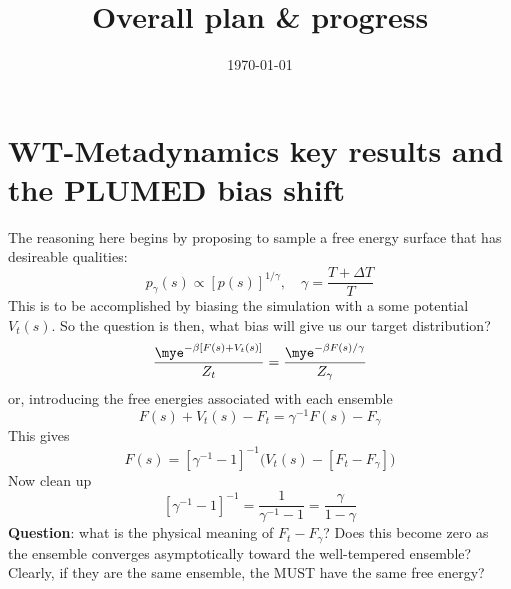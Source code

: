 \documentclass[twocolumn]{notes}
\begin{document}
\title{Overall plan \& progress}
\date{\today} %
\maketitle
\tableofcontents
\newpage







\section{WT-Metadynamics key results and the PLUMED bias shift}

The reasoning here begins by proposing to sample a free energy surface that has desireable qualities:
\[
    p_\gamma(s) \propto [p(s)]^{1/\gamma} ,\quad \gamma = \frac{T+\Delta T}{T}
\]
This is to be accomplished by biasing the simulation with a some potential $V_t(s)$.  So the question is then, what bias will give us our target distribution?
\[
    \frac{\mye^{-\beta[F(s)+V_t(s)]}}{Z_t} = \frac{\mye^{-\beta F(s)/\gamma}}{Z_\gamma}
\]
or, introducing the free energies associated with each ensemble
\[
    F(s)+V_t(s)-F_t = \gamma^{-1}F(s) - F_\gamma
\]
This gives
\[
    F(s) = [\gamma^{-1}-1]^{-1}\Big(V_t(s) - [F_t-F_\gamma] \Big)
\]
Now clean up
\[
    [\gamma^{-1}-1]^{-1} = \frac{1}{\gamma^{-1}-1} = \frac{\gamma}{1-\gamma}
\]
\textbf{Question}: what is the physical meaning of $F_t-F_\gamma$?  Does this become zero as the ensemble converges asymptotically toward the well-tempered ensemble?  Clearly, if they are the same ensemble, the MUST have the same free energy?
\end{document}
